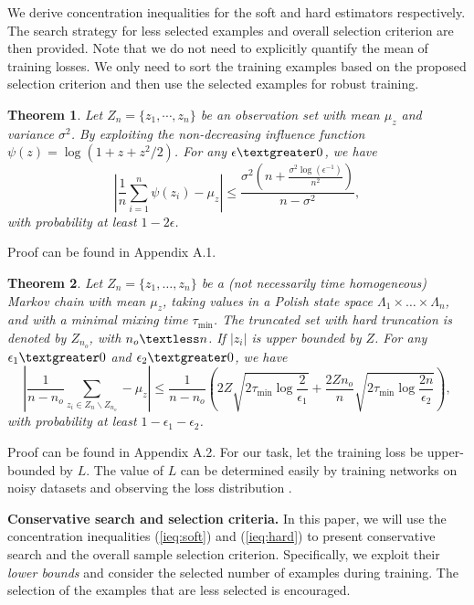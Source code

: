 \documentclass[11pt]{article}
\newtheorem{theorem}{Theorem}
\begin{document}
We derive concentration inequalities for the soft and hard estimators respectively. The search strategy for less selected examples and overall selection criterion are then provided. Note that we do not need to explicitly quantify the mean of training losses. We only need to sort the training examples based on the proposed selection criterion and then use the selected examples for robust training.

\begin{theorem}
Let $Z_n=\{z_1,\cdots,z_n\}$ be an observation set with mean $\mu_z$ and variance $\sigma^2$. By exploiting the non-decreasing influence function $\psi(z)=\log(1+z+z^2/2)$. For any $\epsilon\textgreater0$, we have 
\begin{equation}\label{ieq:soft}
\left|\frac{1}{n}\sum_{i=1}^n\psi(z_i)-\mu_z\right|\leq\frac{\sigma^2(n+\frac{\sigma^2\log(\epsilon^{-1})}{n^2})}{n-\sigma^2},
\end{equation}
with probability at least $1-2\epsilon$.
\end{theorem}
Proof can be found in Appendix A.1. 

\begin{theorem}
Let $Z_n=\{z_1,\ldots,z_n\}$ be a (not necessarily time homogeneous) Markov chain with mean $\mu_z$, taking values
in a Polish state space $\Lambda_1\times\ldots\times\Lambda_n$, and with a minimal mixing time $\tau_{\min}$. The truncated set with hard truncation is denoted by $Z_{n_o}$, with $n_o\textless n$. If $|z_i|$ is upper bounded by $Z$. For any $\epsilon_1\textgreater 0$ and $\epsilon_2\textgreater 0$, we have 
\begin{equation}\label{ieq:hard}
    \left|\frac{1}{n-n_o}\sum_{z_i\in Z_n\backslash Z_{n_o}}-\mu_z\right|\leq\frac{1}{n-n_o}\left(2Z\sqrt{2\tau_{\min}\log\frac{2}{\epsilon_1}}+\frac{2Z n_o}{n}\sqrt{2\tau_{\min}\log\frac{2n}{\epsilon_2}}\right),
\end{equation}
with probability at least $1-\epsilon_1-\epsilon_2$.
\end{theorem}
Proof can be found in Appendix A.2. For our task, let the training loss be upper-bounded by $L$. The value of $L$ can be determined easily by training networks on noisy datasets and observing the loss distribution \citep{arazo2019unsupervised}. 

\textbf{Conservative search and selection criteria.} In this paper, we will use the concentration inequalities (\ref{ieq:soft}) and (\ref{ieq:hard}) to present conservative search and the overall sample selection criterion. Specifically, we exploit their \textit{lower bounds} and consider the selected number of examples during training. The selection of the examples that are less selected is encouraged. 
\end{document}
